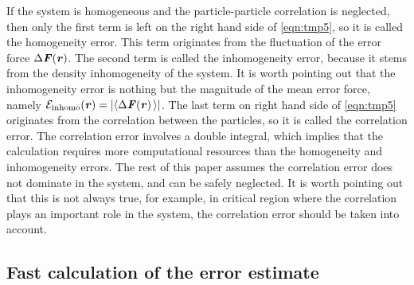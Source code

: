\documentclass[aps,pre,preprint]{revtex4}
\renewcommand{\v}[1]{\textbf{\textit{#1}}}
\begin{document}
If the system is homogeneous and the particle-particle correlation is
neglected, then only the first term is left on the right hand side of \eqref{eqn:tmp5}, so it
is called the homogeneity error.  This term originates from the
fluctuation of the error force $\Delta\v F(\v r)$.  The second term is
called the inhomogeneity error, because it stems from the density
inhomogeneity of the system. It is worth pointing out that the
inhomogeneity error is nothing but the magnitude of the mean error force,
namely $\mathcal E_{\textrm{inhomo}}(\v r) = \vert\langle\Delta\v F(\v
r)\,\rangle\vert$.  The last term on right hand side of \eqref{eqn:tmp5} originates from the
correlation between the particles, so it is called the correlation
error.
The correlation error involves a double integral, which
implies that the calculation  requires more computational resources
than the homogeneity and inhomogeneity errors.
The rest of this paper
assumes the 
correlation error does not dominate in the system, and can be safely
neglected.
It is worth pointing out that this is not always true, for example, in
critical region where the correlation plays an important role in the system,
the correlation error should be taken into account.


\subsection{Fast calculation of the error estimate}\label{sec:tmp1.3}
\end{document}

